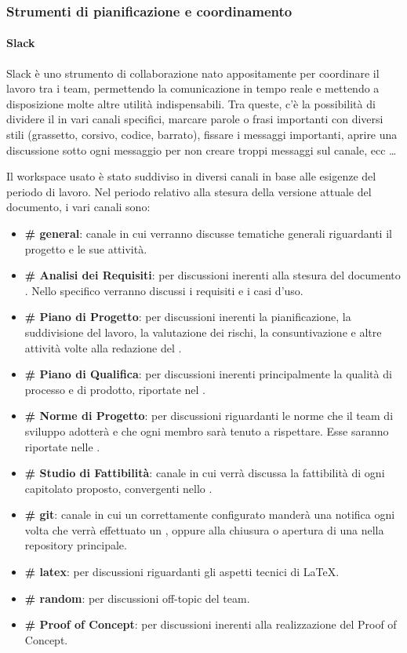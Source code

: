     	\subsubsection{Strumenti di pianificazione e coordinamento}\label{pianificazione e coordinamento}

    		\paragraph{Slack}
			Slack è uno strumento di collaborazione nato appositamente per coordinare il lavoro tra i team, permettendo la comunicazione in tempo
			reale e mettendo a disposizione molte altre utilità indispensabili. Tra queste, c'è la possibilità di dividere il 
			in vari canali specifici, marcare parole o frasi importanti con diversi stili (grassetto, corsivo, codice, barrato), fissare i messaggi
			importanti, aprire una discussione sotto ogni messaggio per non creare troppi messaggi sul canale, ecc \dots

			Il workspace usato è stato suddiviso in diversi canali in base alle esigenze del periodo di lavoro.
			Nel periodo relativo alla stesura della versione attuale del documento, i vari canali sono:
			\begin{itemize}
				\item \textbf{\# general}: canale in cui verranno discusse tematiche generali riguardanti il progetto e le sue attività.
				\item \textbf{\# Analisi dei Requisiti}: per discussioni inerenti alla stesura del documento \AdR. Nello specifico verranno discussi i requisiti e i casi d'uso.
				\item \textbf{\# Piano di Progetto}: per discussioni inerenti la pianificazione, la suddivisione del lavoro, la valutazione dei rischi, la consuntivazione e altre attività volte alla redazione del \PdP.
				\item \textbf{\# Piano di Qualifica}: per discussioni inerenti principalmente la qualità di processo e di prodotto, riportate nel \PdQ.
				\item \textbf{\# Norme di Progetto}: per discussioni riguardanti le norme che il team di sviluppo adotterà e che ogni membro sarà tenuto a rispettare. Esse saranno riportate nelle \NdP.
				\item \textbf{\# Studio di Fattibilità}: canale in cui verrà discussa la fattibilità di ogni capitolato proposto, convergenti nello \SdF.
				\item \textbf{\# git}: canale in cui un  correttamente configurato manderà una notifica ogni volta che verrà effettuato un , oppure alla chiusura o apertura di una  nella repository principale.
				\item \textbf{\# latex}: per discussioni riguardanti gli aspetti tecnici di \LaTeX.
				\item \textbf{\# random}: per discussioni off-topic del team.
				\item \textbf{\# Proof of Concept}: per discussioni inerenti alla realizzazione del Proof of Concept.
			\end{itemize}

